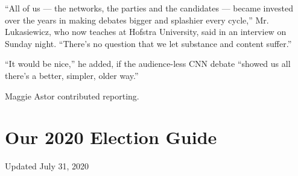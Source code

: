 ``All of us --- the networks, the parties and the candidates --- became
invested over the years in making debates bigger and splashier every
cycle,'' Mr. Lukasiewicz, who now teaches at Hofstra University, said in
an interview on Sunday night. ``There's no question that we let
substance and content suffer.''

``It would be nice,'' he added, if the audience-less CNN debate ``showed
us all there's a better, simpler, older way.''

Maggie Astor contributed reporting.

\hypertarget{our-2020-election-guide}{%
\section{Our 2020 Election Guide}\label{our-2020-election-guide}}

Updated July 31, 2020

